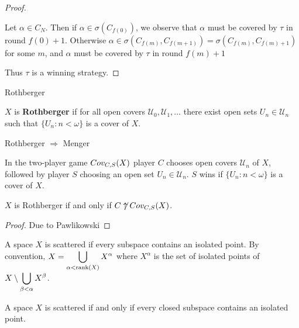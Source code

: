 \begin{proof}
\begin{itemize}
          Let $\alpha \in C_N$. Then if $\alpha \in \sigma(C_{f(0)})$, we observe that $\alpha$ must be covered by $\tau$ in round $f(0)+1$. Otherwise $\alpha \in \sigma(C_{f(m)},C_{f(m+1)})=\sigma(C_{f(m)},C_{f(m)+1})$ for some $m$, and $\alpha$ must be covered by $\tau$ in round $f(m)+1$
      \end{itemize}

      Thus $\tau$ is a winning strategy.
  \end{proof}











\newpage

  \centerline{Rothberger}

  \begin{definition}
    $X$ is \textbf{Rothberger} if for all open covers $\mathcal{U}_0,\mathcal{U}_1,\dots$ there exist open sets $U_n\in \mathcal{U}_n$ such that $\{U_n:n<\omega\}$ is a cover of $X$.
  \end{definition}

  \begin{proposition}
    Rothberger $\Rightarrow$ Menger
  \end{proposition}

  \begin{definition}
    In the two-player game $Cov_{C,S}(X)$ player $C$ chooses open covers $\mathcal{U}_n$ of $X$, followed by player $S$ choosing an open set $U_n\in\mathcal{U}_n$. $S$ wins if $\{U_n:n<\omega\}$ is a cover of $X$.
  \end{definition}

  \begin{theorem}
    $X$ is Rothberger if and only if $C\not\uparrow Cov_{C,S}(X)$.
  \end{theorem}

  \begin{proof}
    Due to Pawlikowski
  \end{proof}

  \begin{definition}
    A space $X$ is scattered if every subspace contains an isolated point. By convention, $\displaystyle X = \bigcup_{\alpha<\textrm{rank}(X)}X^\alpha$ where $X^\alpha$ is the set of isolated points of $\displaystyle X\setminus\bigcup_{\beta<\alpha}X^\beta$.
  \end{definition}

  \begin{proposition}
    A space $X$ is scattered if and only if every closed subspace contains an isolated point.
  \end{proposition}

